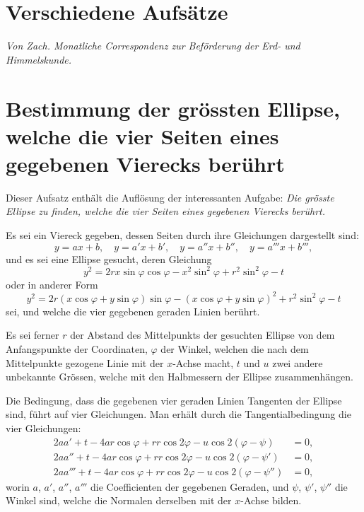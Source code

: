 \documentclass[fontsize=10pt,paper=a5,pagesize,headings=small,headinclude=true,footinclude=true]{scrbook}
\begin{document}
\newpage
\section*{Verschiedene Aufsätze}

\textit{Von Zach. Monatliche Correspondenz zur Beförderung der Erd- und Himmelskunde.}

\newpage
\section*{Bestimmung der grössten Ellipse, welche die vier Seiten eines gegebenen Vierecks berührt}

Dieser Aufsatz enthält die Auflösung der interessanten Aufgabe: \textit{Die grösste Ellipse zu finden, welche die vier Seiten eines gegebenen Vierecks berührt.}

Es sei ein Viereck gegeben, dessen Seiten durch ihre Gleichungen dargestellt sind:
\[
y = ax + b, \quad y = a'x + b', \quad y = a''x + b'', \quad y = a'''x + b''',
\]
und es sei eine Ellipse gesucht, deren Gleichung
\[
y^2 = 2rx\sin\varphi\cos\varphi - x^2\sin^2\varphi + r^2\sin^2\varphi - t
\]
oder in anderer Form
\[
y^2 = 2r(x\cos\varphi + y\sin\varphi)\sin\varphi - (x\cos\varphi + y\sin\varphi)^2 + r^2\sin^2\varphi - t
\]
sei, und welche die vier gegebenen geraden Linien berührt.

Es sei ferner $r$ der Abstand des Mittelpunkts der gesuchten Ellipse von dem Anfangspunkte der Coordinaten, $\varphi$ der Winkel, welchen die nach dem Mittelpunkte gezogene Linie mit der $x$-Achse macht, $t$ und $u$ zwei andere unbekannte Grössen, welche mit den Halbmessern der Ellipse zusammenhängen.

Die Bedingung, dass die gegebenen vier geraden Linien Tangenten der Ellipse sind, führt auf vier Gleichungen. Man erhält durch die Tangentialbedingung die vier Gleichungen:
\begin{align*}
2aa' + t - 4ar\cos\varphi + rr\cos 2\varphi - u\cos 2(\varphi - \psi) &= 0,\\
2aa'' + t - 4ar\cos\varphi + rr\cos 2\varphi - u\cos 2(\varphi - \psi') &= 0,\\
2aa''' + t - 4ar\cos\varphi + rr\cos 2\varphi - u\cos 2(\varphi - \psi'') &= 0,
\end{align*}
worin $a$, $a'$, $a''$, $a'''$ die Coefficienten der gegebenen Geraden, und $\psi$, $\psi'$, $\psi''$ die Winkel sind, welche die Normalen derselben mit der $x$-Achse bilden.
\end{document}
